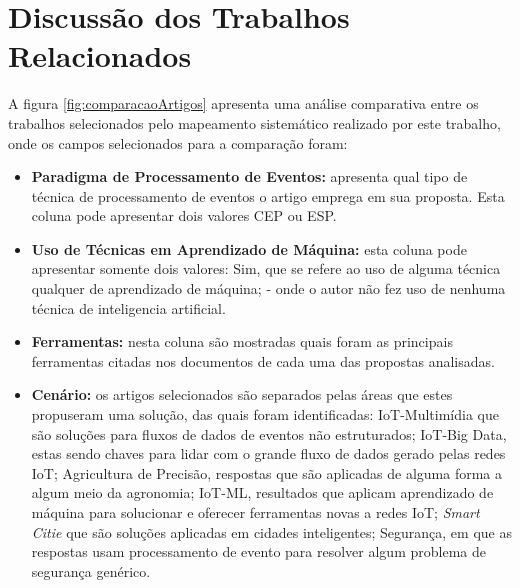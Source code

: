 \documentclass[ti,table]{texufpel} %
\begin{document}
  

  

\section{Discussão dos Trabalhos Relacionados} 

A figura \ref{fig:comparacaoArtigos} apresenta uma análise comparativa entre os trabalhos selecionados pelo mapeamento sistemático realizado por este trabalho, onde os campos selecionados para a comparação foram:  

  

\begin{itemize} 

     

    \item \textbf{Paradigma de Processamento de Eventos:} apresenta qual tipo de técnica de processamento de eventos o artigo emprega em sua proposta. Esta coluna pode apresentar dois valores CEP ou ESP.  

         

     

    \item \textbf{Uso de Técnicas em Aprendizado de Máquina:} esta coluna pode apresentar somente dois valores: Sim, que se refere ao uso de alguma técnica qualquer de aprendizado de máquina; - onde o autor não fez uso de nenhuma técnica de inteligencia artificial.  

     

    \item \textbf{Ferramentas:} nesta coluna são mostradas quais foram as principais ferramentas citadas nos documentos de cada uma das propostas analisadas. 

     

    \item \textbf{Cenário:} os artigos selecionados são separados pelas áreas que estes propuseram uma solução, das quais foram identificadas: IoT-Multimídia que são soluções para fluxos de dados de eventos não estruturados; IoT-Big Data, estas sendo chaves para lidar com o grande fluxo de dados gerado pelas redes IoT; Agricultura de Precisão, respostas que são aplicadas de alguma forma a algum meio da agronomia; IoT-ML, resultados que aplicam aprendizado de máquina para solucionar e oferecer ferramentas novas a redes IoT; \textit{Smart Citie} que são soluções aplicadas em cidades inteligentes; Segurança, em que as respostas usam processamento de evento para resolver algum problema de segurança genérico.  


\end{itemize}
\end{document}
